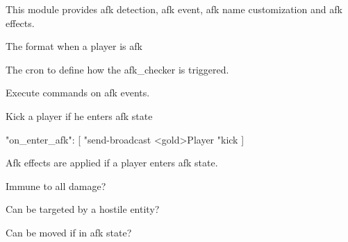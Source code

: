 
This module provides afk detection, afk event, afk name customization and afk effects.


\begin{Configuration}
    \item[format]{The  format when a player is afk}

    \item[afk\_checker]{
        \begin{NestedList}
            \item[]
            \item[cron]{The cron to define how the afk\_checker is triggered.}
        \end{NestedList}

    }

    \item[afk\_event]{
        Execute commands on afk events.
        \begin{example}{Kick a player if he enters afk state}
            \begin{json}
                "on_enter_afk": [
                "send-broadcast <gold>Player %
                "kick %
                ]
            \end{json}
        \end{example}
    }


    \item[event]{
        Afk effects are applied if a player enters afk state.

        \begin{NestedList}
            \item[invulnerable]{
                Immune to all damage?
            }

            \item[targetable]{
                Can be targeted by a hostile entity?
            }

            \item[moveable]{
                Can be moved if in afk state?
            }

        \end{NestedList}
    }

\end{Configuration}













